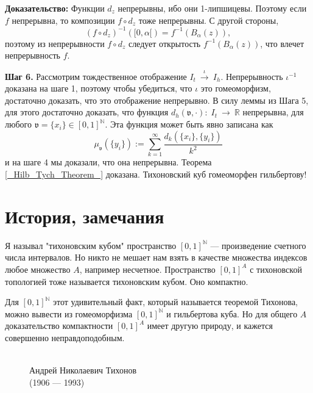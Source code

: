 \documentclass[12pt]{book}
\newcommand{\arrow}{{\:\longrightarrow\:}}
\def\endproof{\hbox{\vrule width 5pt height 5pt depth 0pt}}
\def\R{{\mathbb R}}
\def\N{{\mathbb N}}
\theoremstyle{upshape}
\theoremstyle{generic}
\theoremstyle{upshapenonumber}
\newcommand{\следствие}{%
     \refstepcounter{teorema}
     {\noindent\bf Следствие \thechapter.\arabic{teorema}:\ }}
\newcommand{\пример}{%
     \refstepcounter{teorema}
     {\noindent\bf Пример \thechapter.\arabic{teorema}:\ }}
\newcommand{\лемма}{%
     \refstepcounter{teorema}
     {\noindent\bf Лемма \thechapter.\arabic{teorema}:\ }}
\newcommand{\теорема}{%
     \refstepcounter{teorema}
     {\noindent\bf Теорема \thechapter.\arabic{teorema}:\ }}
\newcommand{\утверждение}{%
     \refstepcounter{teorema}
     {\noindent\bf Утверждение \thechapter.\arabic{teorema}:\ }}
\def\хфилл{\hfill}
\def\ноиндент{\noindent}
\def\бф{\bf}
\def\goth{\mathfrak}
\begin{document}
\хфилл

\ноиндент
{\бф Доказательство:}
Функции $d_z$ непрерывны, ибо они 1-липшицевы.
Поэтому если $f$ непрерывна, то композиции $f\circ d_z$ тоже
непрерывны. С другой стороны, 
\[ (f\circ d_z)^{-1}([0, \alpha[) = f^{-1}(B_\alpha(z)),\]
поэтому из непрерывности $f\circ d_z$ следует
открытость $f^{-1}(B_\alpha(z))$, что влечет
непрерывность $f$.



\хфилл

\noindent
{\бф Шаг 6.} Рассмотрим тождественное отображение
$I_t\stackrel\iota \arrow I_h$. Непрерывность $\iota^{-1}$
доказана на шаге 1, поэтому чтобы убедиться, что
$\iota$ это гомеоморфизм, достаточно доказать, что
это отображение непрерывно. В силу леммы из Шага 5,
для этого достаточно доказать, что функция
$d_h({\goth v}, \cdot):\; I_t \arrow \R$ непрерывна,
для любого ${\goth v}=\{x_i\}\in [0,1]^\N$.
Эта функция может быть явно записана как 
\[
\mu_{\goth v}(\{y_i\}):= \sum_{k=1}^\infty \frac {d_k(\{x_i\}, \{y_i\})}{k^2}
\]
и на шаге 4 мы доказали, что она непрерывна.
Теорема \ref{_Hilb_Tych_Theorem_} 
доказана. Тихоновский куб гомеоморфен гильбертову!
\endproof




\section{История, замечания}


Я называл "тихоновским кубом" пространство
$[0,1]^\N$ --- произведение счетного числа
интервалов. Но никто не мешает нам взять в
качестве множества индексов любое 
множество $A$, например несчетное. 
Пространство $[0,1]^A$ с тихоновской 
топологией тоже называется
тихоновским кубом. Оно компактно.



Для $[0,1]^\N$ этот удивительный факт,
который называется теоремой Тихонова,
можно вывести из гомеоморфизма $[0,1]^\N$
и гильбертова куба. Но для общего $A$
доказательство компактности $[0,1]^A$  
имеет другую природу, и
кажется совершенно неправдоподобным.


\begin{figure}[ht]
\begin{center}
\\
{Андрей Николаевич Тихонов\\
(1906 --- 1993)}
\end{center}
\end{figure}
\end{document}
